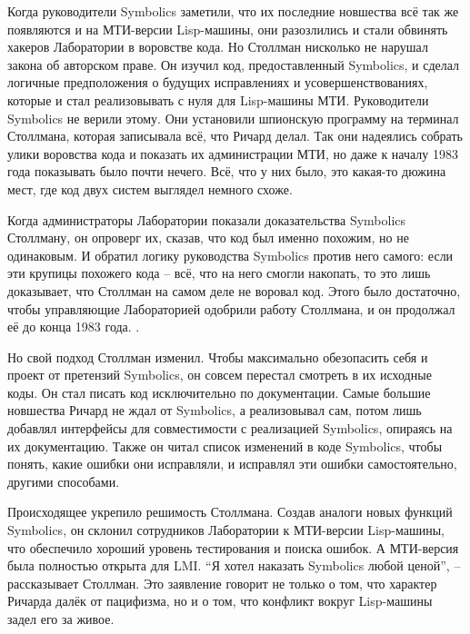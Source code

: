 Когда руководители Symbolics заметили, что их последние новшества всё так же появляются и на МТИ-версии Lisp-машины, они разозлились и стали обвинять хакеров Лаборатории в воровстве кода. Но Столлман нисколько не нарушал закона об авторском праве. Он изучил код, предоставленный Symbolics, и сделал логичные предположения о будущих исправлениях и усовершенствованиях, которые и стал реализовывать с нуля для Lisp-машины МТИ. Руководители Symbolics не верили этому. Они установили шпионскую программу на терминал Столлмана, которая записывала всё, что Ричард делал. Так они надеялись собрать улики воровства кода и показать их администрации МТИ, но даже к началу 1983 года показывать было почти нечего. Всё, что у них было, это какая-то дюжина мест, где код двух систем выглядел немного схоже.

Когда администраторы Лаборатории показали доказательства Symbolics Столлману, он опроверг их, сказав, что код был именно похожим, но не одинаковым. И обратил логику руководства Symbolics против него самого: если эти крупицы похожего кода -- всё, что на него смогли накопать, то это лишь доказывает, что Столлман на самом деле не воровал код. Этого было достаточно, чтобы управляющие Лабораторией одобрили работу Столлмана, и он продолжал её до конца 1983 года. .

Но свой подход Столлман изменил. Чтобы максимально обезопасить себя и проект от претензий Symbolics, он совсем перестал смотреть в их исходные коды. Он стал писать код исключительно по документации. Самые большие новшества Ричард не ждал от Symbolics, а реализовывал сам, потом лишь добавлял интерфейсы для совместимости с реализацией Symbolics, опираясь на их документацию. Также он читал список изменений в коде Symbolics, чтобы понять, какие ошибки они исправляли, и исправлял эти ошибки самостоятельно, другими способами.

Происходящее укрепило решимость Столлмана. Создав аналоги новых функций Symbolics, он склонил сотрудников Лаборатории к МТИ-версии Lisp-машины, что обеспечило хороший уровень тестирования и поиска ошибок. А МТИ-версия была полностью открыта для LMI. \enquote{Я хотел наказать Symbolics любой ценой}, -- рассказывает Столлман. Это заявление говорит не только о том, что характер Ричарда далёк от пацифизма, но и о том, что конфликт вокруг Lisp-машины задел его за живое.


